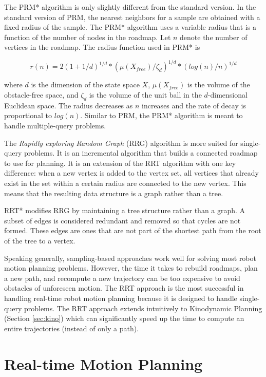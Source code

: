 \documentclass[10pt,conference]{ieeeconf}
\begin{document}
The PRM* algorithm is only slightly different from the standard version. In the standard version of PRM, the nearest neighbors for a sample are obtained with a fixed radius of the sample. The PRM* algorithm uses a variable radius that is a function of the number of nodes in the roadmap. Let $n$ denote the number of vertices in the roadmap. The radius function used in PRM* is 

\begin{equation}
r(n) = 2(1+1/d)^{1/d}*(\mu(X_{free})/ \zeta_d)^{1/d} * (log(n)/n)^{1/d}
\end{equation}

where $d$ is the dimension of the state space $X$, $\mu(X_{free})$ is the volume of the obstacle-free space, and $\zeta_d$ is the volume of the unit ball in the $d$-dimensional Euclidean space. The radius decreases as $n$ increases and the rate of decay is proportional to $log(n)$. Similar to PRM, the PRM* algorithm is meant to handle multiple-query problems. 

The \emph{Rapidly exploring Random Graph} (RRG) algorithm is more suited for single-query problems. It is an incremental algorithm that builds a connected roadmap to use for planning. It is an extension of the RRT algorithm with one key difference: when a new vertex is added to the vertex set, all vertices that already exist in the set within a certain radius are connected to the new vertex. This means that the resulting data structure is a graph rather than a tree.

RRT* modifies RRG by maintaining a tree structure rather than a graph. A subset of edges is considered redundant and removed so that cycles are not formed. These edges are ones that are not part of the shortest path from the root of the tree to a vertex.


Speaking generally, sampling-based approaches work well for solving most robot motion planning problems. However, the time it takes to rebuild roadmaps, plan a new path, and recompute a new trajectory can be too expensive to avoid obstacles of unforeseen motion. The RRT approach is the most successful in handling real-time robot motion planning because it is designed to handle single-query problems. The RRT approach extends intuitively to Kinodynamic Planning (Section \ref{sec:kino}) which can significantly speed up the time to compute an entire trajectories (instead of only a path).



\section{Real-time Motion Planning} \label{sec:real-time}
\end{document}
